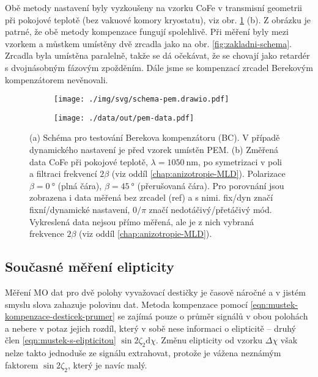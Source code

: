 Obě metody nastavení byly vyzkoušeny na vzorku CoFe v transmisní geometrii při pokojové teplotě (bez vakuové komory kryostatu), viz obr. \ref{fig:berek} (b).
Z obrázku je patrné, že obě metody kompenzace fungují spolehlivě.
Při měření byly mezi vzorkem a můstkem umístěny dvě zrcadla jako na obr. \ref{fig:zakladni-schema}.
Zrcadla byla umístěna paralelně, takže se dá očekávat, že se chovají jako retardér s dvojnásobným fázovým zpožděním.
Dále jsme se kompenzací zrcadel Berekovým kompenzátorem nevěnovali.

\begin{figure}[htbp]
    \centering
    \begin{subfigure}{.48\textwidth}
        \centering
        \texttt{[image: ./img/svg/schema-pem.drawio.pdf]}
    \end{subfigure}
    \begin{subfigure}{.48\textwidth}
        \centering
        \texttt{[image: ./data/out/pem-data.pdf]}
    \end{subfigure}
    \caption{(a) Schéma pro testování Berekova kompenzátoru (BC). V případě dynamického nastavení je před vzorek umístěn PEM. 
    (b) Změřená data CoFe při pokojové teplotě, $\lambda=\SI{1050}{\nano\meter}$, po symetrizaci v poli a filtraci frekvencí $2\beta$ (viz oddíl \ref{chap:anizotropie-MLD}). Polarizace $\beta=\SI{0}{\degree}$ (plná čára), $\beta=\SI{45}{\degree}$ (přerušovaná čára). Pro porovnání jsou zobrazena i data měřená bez zrcadel (ref) a s nimi. fix/dyn značí fixní/dynamické nastavení, $0/\pi$ značí nedotáčivý/přetáčivý mód. Vykreslená data nejsou přímo měřená, ale je z nich vybraná frekvence $2\beta$ (viz oddíl \ref{chap:anizotropie-MLD}).}
    \label{fig:berek}
\end{figure}

\subsection{Současné měření elipticity}
\label{chap:elipticita}

Měření MO dat pro dvě polohy vyvažovací destičky je časově náročné a v jistém smyslu slova zahazuje polovinu dat.
Metoda kompenzace pomocí \eqref{eqn:mustek-kompenzace-desticek-prumer} se zajímá pouze o průměr signálů v obou polohách a nebere v potaz jejich rozdíl, který v sobě nese informaci o elipticitě -- druhý člen \eqref{eqn:mustek-s-elipticitou} $\sin2\zeta_2 \textrm{d}\chi$.
Změnu elipticity od vzorku $\Delta\chi$ však nelze takto jednoduše ze signálu extrahovat, protože je vážena neznámým faktorem $\sin2\zeta_2$, který je navíc malý.

